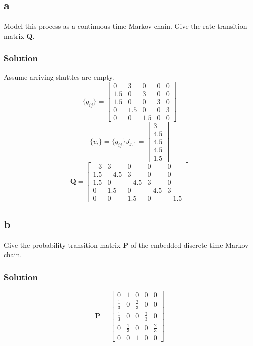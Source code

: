 \documentclass[letterpaper]{amsart}
\begin{document}
\subsection*{a}
 Model this process as a continuous-time Markov chain. Give the rate
 transition matrix $\mathbf{Q}$.
\subsubsection*{Solution}
Assume arriving shuttles are empty.
\begin{equation*}
  \{q_{ij}\}=
\begin{bmatrix}
  0 & 3 & 0 & 0 & 0 \\
  1.5 & 0 & 3 & 0 & 0 \\
  1.5 & 0 & 0 & 3 & 0 \\
  0 & 1.5 & 0 & 0 & 3 \\
  0 & 0 & 1.5 & 0 & 0
\end{bmatrix}
\end{equation*}
\begin{equation*}
  \{v_i\}=
  \{q_{ij}\}J_{j,1} =
\begin{bmatrix}
  3 \\ 4.5 \\ 4.5 \\ 4.5 \\ 1.5
\end{bmatrix}
\end{equation*}
\begin{equation*}
  \mathbf{Q} =
\begin{bmatrix}
  -3 & 3 & 0 & 0 & 0 \\
  1.5 & -4.5 & 3 & 0 & 0 \\
  1.5 & 0 & -4.5 & 3 & 0 \\
  0 & 1.5 & 0 & -4.5 & 3 \\
  0 & 0 & 1.5 & 0 & -1.5
\end{bmatrix}
\end{equation*}
\subsection*{b}
Give the probability transition matrix $\mathbf{P}$ of the embedded discrete-time
Markov chain.
\subsubsection*{Solution}
\begin{equation*}
  \mathbf{P} =
\begin{bmatrix}
  0 & 1 & 0 & 0 & 0 \\
  \frac{1}{3} & 0 & \frac{2}{3} & 0 & 0 \\
  \frac{1}{3} & 0 & 0 & \frac{2}{3} & 0 \\
  0 & \frac{1}{3} & 0 & 0 & \frac{2}{3} \\
  0 & 0 & 1 & 0 & 0
\end{bmatrix}
\end{equation*}
\end{document}
